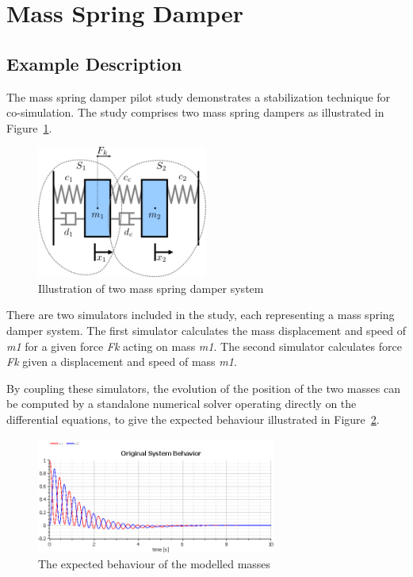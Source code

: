 \section{Mass Spring Damper}
\label{sec:massspringdamper}

\subsection{Example Description}
\label{sec:massspringdamper_desc}

The mass spring damper pilot study demonstrates a stabilization technique for co-simulation. The study comprises two mass spring dampers as illustrated in Figure~\ref{fig:msdoverview}. 

\begin{figure}[htbp]
\begin{center}
\includegraphics[width=0.5\textwidth]{massSpringDamper/MSDOverview}
\caption{Illustration of two mass spring damper system}
\label{fig:msdoverview}
\end{center}
\end{figure}

There are two simulators included in the study, each representing a mass spring damper system. The first simulator calculates the mass displacement and speed of \emph{m1} for a given force \emph{Fk} acting on mass \emph{m1}. The second simulator calculates force \emph{Fk} given a displacement and speed of mass \emph{m1}.

By coupling these simulators, the evolution of the position of the two masses can be computed by a standalone numerical solver operating directly on the differential equations, to give the expected behaviour illustrated in Figure~\ref{fig:msdexpected}. 


\begin{figure}[htbp]
	\begin{center}
		\includegraphics[width=0.7\textwidth]{massSpringDamper/MSDExpected}
		\caption{The expected behaviour of the modelled masses}
		\label{fig:msdexpected}
	\end{center}
\end{figure}

